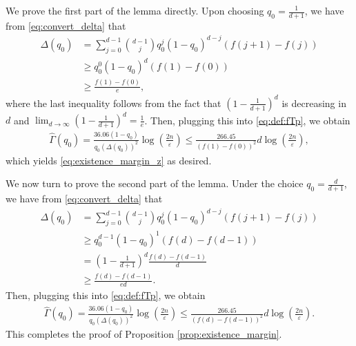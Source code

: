 \documentclass[onecolumn,letterpaper]{IEEEtran}
\newcommand{\cp}{{q}}
\newcommand{\spgap}{{\Delta}}
\newcommand{\ftaup}{{\hat{\Gamma}}}
\newcommand{\cpns}{\cp_0}
\newcommand{\fTpns}{\ftaup (\cpns)}
\begin{document}
\begin{IEEEproof}
We prove the first part of the lemma directly.
Upon choosing $\cpns = \frac {1} {d+1}$, we have from \eqref{eq:convert_delta} that 
\begin{align*}
    \spgap(\cpns) &= \sum\limits_{j=0}^{d-1} \binom{d-1}{j} \cpns^j (1-\cpns)^{d-j} (f(j+1) - f(j)) \\ 
    &\ge \cpns^0 (1-\cpns)^{d}  (f(1) - f(0)) \\
    &\ge \frac{f(1) - f(0)}{e}, 
\end{align*}
where the last inequality follows from the fact that $\left(1-\frac{1}{d+1}\right)^d$ is decreasing in $d$ and $\lim_{d\to \infty}\left(1-\frac{1}{d+1}\right)^d=\frac 1 e$.
Then, plugging this into \eqref{eq:def:fTp}, we obtain
\begin{align*}
    \fTpns = \frac{36.06(1-\cpns)}{\cpns (\spgap(\cpns))^2} \log \left( \frac{2n}{\varepsilon} \right) \le \frac{266.45}{(f(1) - f(0))^2} d \log \left( \frac{2n}{\varepsilon} \right) ,
\end{align*}
which yields \eqref{eq:existence_margin_z} as desired. 


We now turn to prove the second part of the lemma. Under the choice $\cpns = \frac {d} {d+1}$, we have from \eqref{eq:convert_delta} that
\begin{align*}
    \spgap(\cpns) &= \sum\limits_{j=0}^{d-1} \binom{d-1}{j} \cpns^j (1-\cpns)^{d-j} (f(j+1) - f(j)) \\
    &\ge \cpns^{d-1} (1-\cpns)^{1} (f(d) - f(d-1)) \\ 
    &= \left( 1-\frac{1}{d+1} \right)^d \frac{f(d)-f(d-1)}{d} \\
    &\ge \frac{f(d) - f(d-1)}{ed}. 
\end{align*}
Then, plugging this into \eqref{eq:def:fTp}, we obtain
\begin{align*}
    \fTpns = \frac{36.06(1-\cpns)}{\cpns (\spgap(\cpns))^2} \log \left( \frac{2n}{\varepsilon} \right) \le \frac{266.45}{(f(d) - f(d-1))^2} d \log \left( \frac{2n}{\varepsilon} \right).
\end{align*}
This completes the proof of Proposition \ref{prop:existence_margin}. 
\end{IEEEproof}
\end{document}
